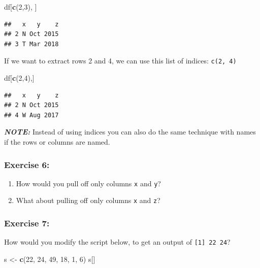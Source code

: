 \documentclass[
  10pt,
  letterpaper,
  twoside,
  openright]{book}
\newenvironment{Shaded}{\begin{snugshade}}{\end{snugshade}}
\newcommand{\DecValTok}[1]{\textcolor[rgb]{0.00,0.00,0.81}{#1}}
\newcommand{\FunctionTok}[1]{\textcolor[rgb]{0.13,0.29,0.53}{\textbf{#1}}}
\newcommand{\NormalTok}[1]{#1}
\newcommand{\OtherTok}[1]{\textcolor[rgb]{0.56,0.35,0.01}{#1}}
\providecommand{\tightlist}{%
  \setlength{\itemsep}{0pt}\setlength{\parskip}{0pt}}
\begin{document}
\begin{Shaded}
\begin{Highlighting}[]
\NormalTok{df[}\FunctionTok{c}\NormalTok{(}\DecValTok{2}\NormalTok{,}\DecValTok{3}\NormalTok{), ]}
\end{Highlighting}
\end{Shaded}

\begin{verbatim}
##   x   y    z
## 2 N Oct 2015
## 3 T Mar 2018
\end{verbatim}

If we want to extract rows 2 and 4, we can use this list of indices:
\texttt{c(2,\ 4)}

\begin{Shaded}
\begin{Highlighting}[]
\NormalTok{df[}\FunctionTok{c}\NormalTok{(}\DecValTok{2}\NormalTok{,}\DecValTok{4}\NormalTok{),]}
\end{Highlighting}
\end{Shaded}

\begin{verbatim}
##   x   y    z
## 2 N Oct 2015
## 4 W Aug 2017
\end{verbatim}

\textbf{\emph{NOTE:}} Instead of using indices you can also do the same
technique with names if the rows or columns are named.

\hypertarget{exercise-6}{%
\subsubsection{Exercise 6:}\label{exercise-6}}

\begin{enumerate}
\def\labelenumi{\arabic{enumi}.}
\tightlist
\item
  How would you pull off only columns \texttt{x} and \texttt{y}?
\item
  What about pulling off only columns \texttt{x} and \texttt{z}?
\end{enumerate}

\hypertarget{exercise-7}{%
\subsubsection{Exercise 7:}\label{exercise-7}}

How would you modify the script below, to get an output of
\texttt{{[}1{]}\ 22\ 24}?

\begin{Shaded}
\begin{Highlighting}[]
\NormalTok{s }\OtherTok{\textless{}{-}} \FunctionTok{c}\NormalTok{(}\DecValTok{22}\NormalTok{, }\DecValTok{24}\NormalTok{, }\DecValTok{49}\NormalTok{, }\DecValTok{18}\NormalTok{, }\DecValTok{1}\NormalTok{, }\DecValTok{6}\NormalTok{)}
\NormalTok{s[]}
\end{Highlighting}
\end{Shaded}
\end{document}
